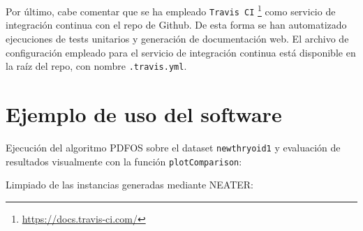 Por último, cabe comentar que se ha empleado \texttt{Travis CI} \footnote{\url{https://docs.travis-ci.com/}} como servicio de integración
continua con el repo de Github. De esta forma se han automatizado ejecuciones de tests unitarios y generación de documentación web. El
archivo de configuración empleado para el servicio de integración continua está disponible en la raíz del repo, con nombre 
\texttt{.travis.yml}.

\section{Ejemplo de uso del software}
Ejecución del algoritmo PDFOS sobre el dataset \texttt{newthryoid1} y evaluación de resultados visualmente con la función
\texttt{plotComparison}:



Limpiado de las instancias generadas mediante NEATER:


